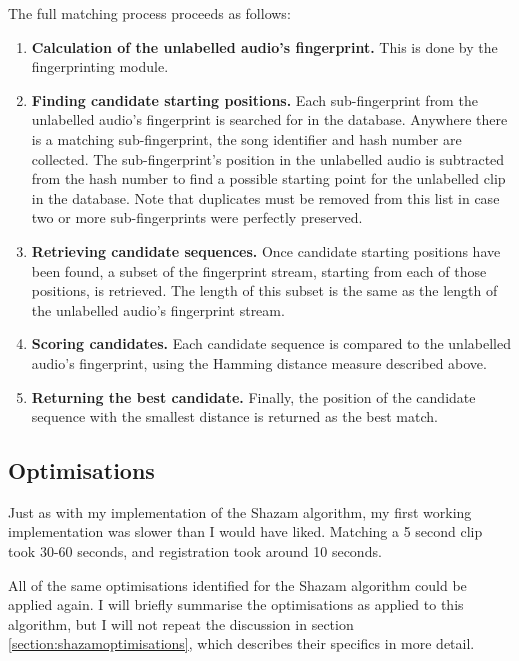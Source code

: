 \documentclass[12pt,a4paper,twoside,openright]{report}
\begin{document}
The full matching process proceeds as follows:

\begin{enumerate}

  \item \textbf{Calculation of the unlabelled audio's fingerprint.} This is done by the fingerprinting module.

  \item \textbf{Finding candidate starting positions.} Each sub-fingerprint from the unlabelled audio's fingerprint is searched for in the database. Anywhere there is a matching sub-fingerprint, the song identifier and hash number are collected. The sub-fingerprint's position in the unlabelled audio is subtracted from the hash number to find a possible starting point for the unlabelled clip in the database. Note that duplicates must be removed from this list in case two or more sub-fingerprints were perfectly preserved.

  \item \textbf{Retrieving candidate sequences.} Once candidate starting positions have been found, a subset of the fingerprint stream, starting from each of those positions, is retrieved. The length of this subset is the same as the length of the unlabelled audio's fingerprint stream.

  \item \textbf{Scoring candidates.} Each candidate sequence is compared to the unlabelled audio's fingerprint, using the Hamming distance measure described above.

  \item \textbf{Returning the best candidate.} Finally, the position of the candidate sequence with the smallest distance is returned as the best match.

\end{enumerate}

\subsection{Optimisations}

Just as with my implementation of the Shazam algorithm, my first working implementation was slower than I would have liked. Matching a 5 second clip took 30-60 seconds, and registration took around 10 seconds. 

All of the same optimisations identified for the Shazam algorithm could be applied again. I will briefly summarise the optimisations as applied to this algorithm, but I will not repeat the discussion in section \ref{section:shazamoptimisations}, which describes their specifics in more detail.
\end{document}

